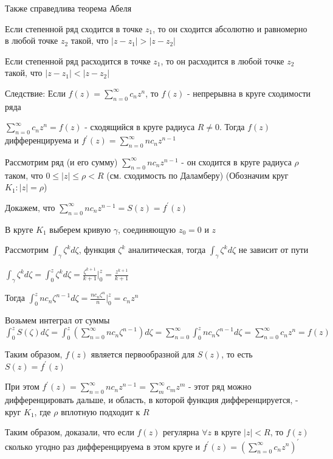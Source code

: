 \documentclass[12pt]{article}
\begin{document}
\Nota Также справедлива теорема Абеля

\begin{MyTheorem}
    
    Если степенной ряд сходится в точке $z_1$, то он сходится абсолютно и равномерно 
    в любой точке $z_2$ такой, что $|z - z_1| > |z - z_2|$

    Если степенной ряд расходится в точке $z_1$, то он расходится
    в любой точке $z_2$ такой, что $|z - z_1| < |z - z_2|$
\end{MyTheorem}


Следствие: Если $f(z) = \sum_{n = 0}^\infty c_n z^n$, то $f(z)$ - непрерывна в круге сходимости ряда

\begin{MyTheorem}

    $\sum_{n = 0}^\infty c_n z^n = f(z)$ - сходящийся в круге радиуса $R \neq 0$. Тогда $f(z)$ дифференцируема и 
    $f^\prime(z) = \sum_{n = 0}^\infty n c_n z^{n - 1}$
\end{MyTheorem}

\begin{MyProof}
    Рассмотрим ряд (и его сумму) $\sum_{n = 0}^\infty n c_n z^{n - 1}$ - он сходится в круге радиуса $\rho$ таком, что $0 \leq |z| \leq \rho < R$
    (см. сходимость по Даламберу) (Обозначим круг $K_1 : |z| = \rho$)

    Докажем, что $\sum_{n = 0}^\infty n c_n z^{n - 1} = S(z) = f^\prime(z)$

    В круге $K_1$ выберем кривую $\gamma$, соединяющую $z_0 = 0$ и $z$

    Рассмотрим $\int_\gamma \zeta^k d \zeta$, функция $\zeta^k$ аналитическая, тогда $\int_\gamma \zeta^k d\zeta$ не зависит от пути 

    $\int_\gamma \zeta^k d\zeta = \int_0^z \zeta^k d\zeta = \frac{\zeta^{k + 1}}{k + 1} \Big|^z_0 = \frac{z^{k + 1}}{k + 1}$

    Тогда $\int_0^z n c_n \zeta^{n - 1} d\zeta = \frac{n c_n \zeta^n}{n} \Big|_0^z = c_n z^n$

    Возьмем интеграл от суммы $\int_0^z S(\zeta) d\zeta = \int_0^z \left(\sum_{n = 0}^\infty n c_n \zeta^{n - 1}\right) d\zeta = 
    \sum_{n = 0}^\infty \int_0^z n c_n \zeta^{n - 1} d\zeta = \sum_{n = 0}^\infty c_n z^n = f(z)$

    Таким образом, $f(z)$ является первообразной для $S(z)$, то есть $S(z) = f^\prime(z)$

    При этом $f^\prime (z) = \sum_{n = 0}^\infty n c_n z^{n - 1} = \sum_{m}^\infty c_m z^m$ - этот ряд
    можно дифференцировать дальше, и область, в которой функция дифференцируется, - круг $K_1$, где $\rho$ вплотную подходит к $R$

    Таким образом, доказали, что если $f(z)$ регулярна $\forall z$ в круге $|z| < R$, то $f(z)$ сколько угодно раз дифференцируема в этом круге и $f^\prime(z) = \left(\sum_{n = 0}^\infty c_n z^n\right)^\prime$
\end{MyProof}
\end{document}

